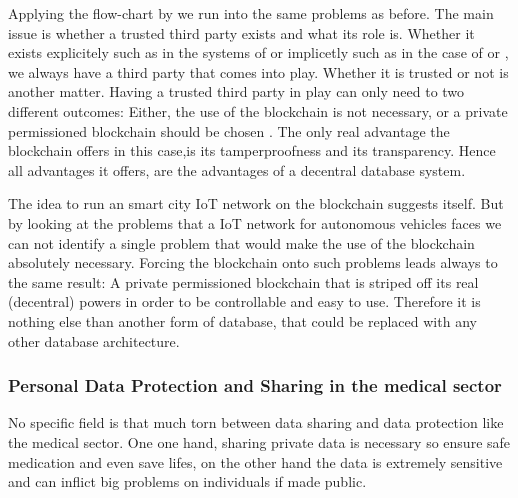 Applying the flow-chart by \citeauthor{Wust2017} we run into the same problems as before. The main issue is whether a trusted third party exists and what its role is. Whether it exists explicitely such as in the systems of \cite{Sharma2017} or implicetly such as in the case of \cite{Rowan2017} or \cite{DorriSteger2017}, we always have a third party that comes into play. Whether it is trusted or not is another matter.
Having a trusted third party in play can only need to two different outcomes: Either, the use of the blockchain is not necessary, or a private permissioned blockchain should be chosen \cite{Wust2017}.
The only real advantage the blockchain offers in this case,is its tamperproofness and its transparency. Hence all advantages it offers, are the advantages of a decentral database system.

The idea to run an smart city IoT network on the blockchain suggests itself. 
But by looking at the problems that a IoT network for autonomous vehicles faces we can not identify a single problem that would make the use of the blockchain absolutely necessary. Forcing the blockchain onto such problems leads always to the same result: A private permissioned blockchain that is striped off its real (decentral) powers in order to be controllable and easy to use. Therefore it is nothing else than another form of database, that could be replaced with any other database architecture.




\subsubsection{Personal Data Protection and Sharing in the medical sector}
No specific field is that much torn between data sharing and data protection like the medical sector. One one hand, sharing private data is necessary so ensure safe medication and even save lifes, on the other hand the data is extremely sensitive and can inflict big problems on individuals if made public. 

